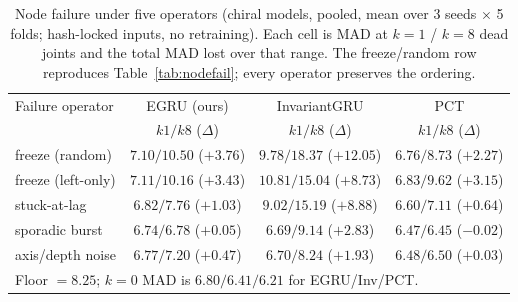 \begin{table}[!t]
\centering
\caption{Node failure under five operators (chiral models, pooled, mean over 3 seeds $\times$ 5 folds;
hash-locked inputs, no retraining). Each cell is MAD at $k\!=\!1$ / $k\!=\!8$ dead joints and the
total MAD lost over that range. The freeze/random row reproduces Table~\ref{tab:nodefail}; every
operator preserves the ordering.}
\label{tab:nodefail_modes}
\scriptsize
\setlength{\tabcolsep}{3pt}
\begin{tabular}{lccc}
\toprule
Failure operator & EGRU (ours) & InvariantGRU & PCT \\
 & \scriptsize $k1/k8$ ($\Delta$) & \scriptsize $k1/k8$ ($\Delta$) & \scriptsize $k1/k8$ ($\Delta$) \\
\midrule
freeze (random)      & $7.10/10.50$ ($+3.76$) & $9.78/18.37$ ($+12.05$) & $6.76/8.73$ ($+2.27$) \\
freeze (left-only)   & $7.11/10.16$ ($+3.43$) & $10.81/15.04$ ($+8.73$) & $6.83/9.62$ ($+3.15$) \\
stuck-at-lag         & $6.82/7.76$ ($+1.03$)  & $9.02/15.19$ ($+8.88$)  & $6.60/7.11$ ($+0.64$) \\
sporadic burst       & $6.74/6.78$ ($+0.05$)  & $6.69/9.14$ ($+2.83$)   & $6.47/6.45$ ($-0.02$) \\
axis/depth noise     & $6.77/7.20$ ($+0.47$)  & $6.70/8.24$ ($+1.93$)   & $6.48/6.50$ ($+0.03$) \\
\bottomrule
\multicolumn{4}{l}{\footnotesize Floor $=8.25$; $k\!=\!0$ MAD is $6.80/6.41/6.21$ for EGRU/Inv/PCT.} \\
\end{tabular}
\end{table}

